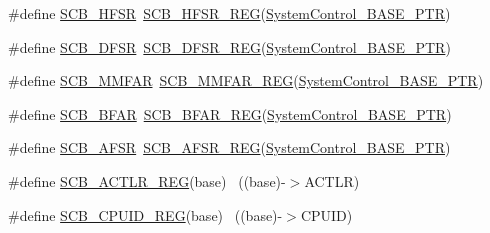 \begin{DoxyCompactItemize}
\#define \hyperlink{group___s_c_b___register___accessor___macros_gaf8ffd3e54cbb7642101d979bd91cfa25}{S\+C\+B\+\_\+\+H\+F\+SR}~\hyperlink{group___s_c_b___register___accessor___macros_ga82f9f02807dd20f1f97226fcbeb5771e}{S\+C\+B\+\_\+\+H\+F\+S\+R\+\_\+\+R\+EG}(\hyperlink{group___s_c_b___peripheral_gaf22864785770f832103e904244e078cb}{System\+Control\+\_\+\+B\+A\+S\+E\+\_\+\+P\+TR})
\item 
\#define \hyperlink{group___s_c_b___register___accessor___macros_gae3a7746f39eaa9eb3cd867d1dc327c8b}{S\+C\+B\+\_\+\+D\+F\+SR}~\hyperlink{group___s_c_b___register___accessor___macros_ga2ac45bf07176acb69b71189cddba46dc}{S\+C\+B\+\_\+\+D\+F\+S\+R\+\_\+\+R\+EG}(\hyperlink{group___s_c_b___peripheral_gaf22864785770f832103e904244e078cb}{System\+Control\+\_\+\+B\+A\+S\+E\+\_\+\+P\+TR})
\item 
\#define \hyperlink{group___s_c_b___register___accessor___macros_ga1fc21962567cb3e1c6ac552ed3068091}{S\+C\+B\+\_\+\+M\+M\+F\+AR}~\hyperlink{group___s_c_b___register___accessor___macros_gafbf4831267e040e9b4710ae9fb63c2c9}{S\+C\+B\+\_\+\+M\+M\+F\+A\+R\+\_\+\+R\+EG}(\hyperlink{group___s_c_b___peripheral_gaf22864785770f832103e904244e078cb}{System\+Control\+\_\+\+B\+A\+S\+E\+\_\+\+P\+TR})
\item 
\#define \hyperlink{group___s_c_b___register___accessor___macros_gaee532e1c3e3c27881a564b9a63f036cd}{S\+C\+B\+\_\+\+B\+F\+AR}~\hyperlink{group___s_c_b___register___accessor___macros_ga9932d2c86e9f7cd72b4fbca18863e757}{S\+C\+B\+\_\+\+B\+F\+A\+R\+\_\+\+R\+EG}(\hyperlink{group___s_c_b___peripheral_gaf22864785770f832103e904244e078cb}{System\+Control\+\_\+\+B\+A\+S\+E\+\_\+\+P\+TR})
\item 
\#define \hyperlink{group___s_c_b___register___accessor___macros_ga16a8b546ae510f0d470908e8ac913d11}{S\+C\+B\+\_\+\+A\+F\+SR}~\hyperlink{group___s_c_b___register___accessor___macros_ga9835a953f824d051f48ab361ba7ec70c}{S\+C\+B\+\_\+\+A\+F\+S\+R\+\_\+\+R\+EG}(\hyperlink{group___s_c_b___peripheral_gaf22864785770f832103e904244e078cb}{System\+Control\+\_\+\+B\+A\+S\+E\+\_\+\+P\+TR})
\item 
\#define \hyperlink{group___s_c_b___register___accessor___macros_gacc7b0065f69b9a0d772af30505d9d5e8}{S\+C\+B\+\_\+\+A\+C\+T\+L\+R\+\_\+\+R\+EG}(base)                                        ~((base)-\/$>$A\+C\+T\+LR)
\item 
\#define \hyperlink{group___s_c_b___register___accessor___macros_ga0fafcf57528f45b4ef5f3c5bfa627d55}{S\+C\+B\+\_\+\+C\+P\+U\+I\+D\+\_\+\+R\+EG}(base)                                        ~((base)-\/$>$C\+P\+U\+ID)

\end{DoxyCompactItemize}

